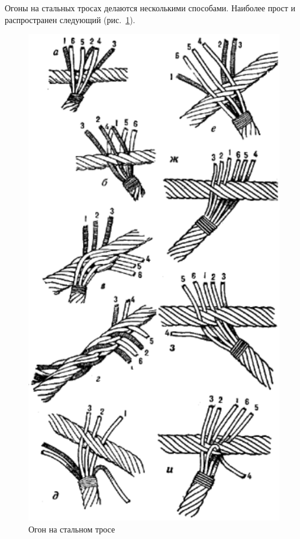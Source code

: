 \documentclass[a4paper, 12pt, twoside, final]{scrbook}
\begin{document}
Огоны на стальных тросах делаются несколькими способами. Наиболее прост и распространен следующий (рис.~\ref{fig:67}).

\begin{figure}[htbp]
   \centering
   \includegraphics{67_Ogon_na_st_trose} %
   \caption{Огон на стальном тросе}
   \label{fig:67}
\end{figure}
\end{document}
